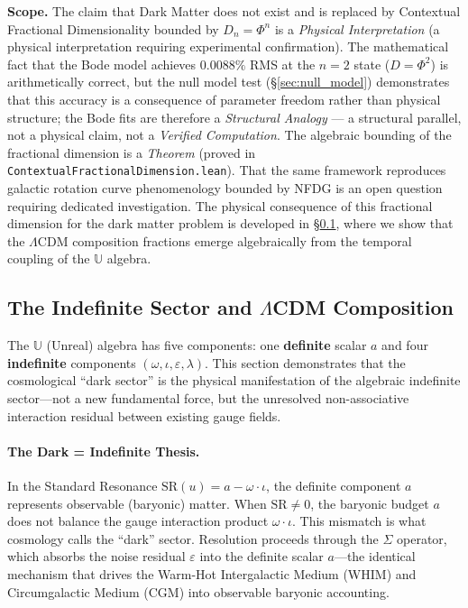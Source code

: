 \textbf{Scope.} The claim that Dark Matter does not exist and is replaced by Contextual Fractional Dimensionality bounded by $D_n = \Phi^n$ is a \emph{Physical Interpretation} (a physical interpretation requiring experimental confirmation). The mathematical fact that the Bode model achieves $0.0088\%$ RMS at the $n=2$ state ($D = \Phi^2$) is arithmetically correct, but the null model test (\S\ref{sec:null_model}) demonstrates that this accuracy is a consequence of parameter freedom rather than physical structure; the Bode fits are therefore a \emph{Structural Analogy} --- a structural parallel, not a physical claim, not a \emph{Verified Computation}. The algebraic bounding of the fractional dimension is a \emph{Theorem} (proved in \texttt{ContextualFractionalDimension.lean}). That the same framework reproduces galactic rotation curve phenomenology bounded by NFDG is an open question requiring dedicated investigation. The physical consequence of this fractional dimension for the dark matter problem is developed in \S\ref{sec:indefinite_sector}, where we show that the $\Lambda$CDM composition fractions emerge algebraically from the temporal coupling of the $\mathbb{U}$ algebra.

\subsection{The Indefinite Sector and $\Lambda$CDM Composition}\label{sec:indefinite_sector}

The $\mathbb{U}$ (Unreal) algebra has five components: one \textbf{definite} scalar $a$ and four \textbf{indefinite} components $(\omega, \iota, \varepsilon, \lambda)$. This section demonstrates that the cosmological ``dark sector'' is the physical manifestation of the algebraic indefinite sector---not a new fundamental force, but the unresolved non-associative interaction residual between existing gauge fields.

\paragraph{The Dark = Indefinite Thesis.}
In the Standard Resonance $\mathrm{SR}(u) = a - \omega \cdot \iota$, the definite component $a$ represents observable (baryonic) matter. When $\mathrm{SR} \neq 0$, the baryonic budget $a$ does not balance the gauge interaction product $\omega \cdot \iota$. This mismatch is what cosmology calls the ``dark'' sector. Resolution proceeds through the $\Sigma$ operator, which absorbs the noise residual $\varepsilon$ into the definite scalar $a$---the identical mechanism that drives the Warm-Hot Intergalactic Medium (WHIM) and Circumgalactic Medium (CGM) into observable baryonic accounting.

